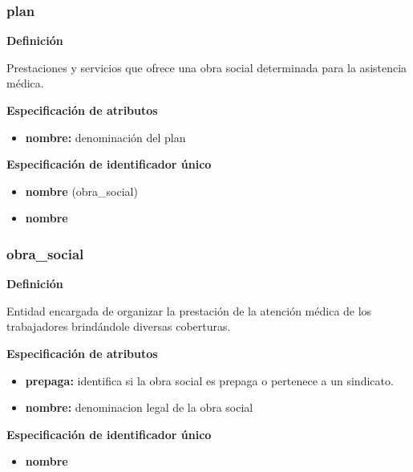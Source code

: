 \documentclass[a4paper,11pt]{article}
\begin{document}
\subsubsection{\textbf{plan}}

\textbf{Definición}

Prestaciones y servicios que ofrece una obra social determinada para la asistencia médica.

\textbf{Especificación de atributos}

\begin{itemize}

     \item \textbf{nombre:} denominación del plan

\end{itemize}

\textbf{Especificación de identificador único}

\begin{itemize}

     \item \textbf{nombre} (obra\_social)

     \item \textbf{nombre}

\end{itemize}

\subsubsection{\textbf{obra\_social}}

\textbf{Definición}

Entidad encargada de organizar la prestación de la atención médica de los 
trabajadores brindándole diversas coberturas.

\textbf{Especificación de atributos}

\begin{itemize}

     \item \textbf{prepaga:} identifica si la obra social es prepaga o pertenece a un sindicato.

     \item \textbf{nombre:} denominacion legal de la obra social

\end{itemize}

\textbf{Especificación de identificador único}

\begin{itemize}

     \item \textbf{nombre}

\end{itemize}
\end{document}
